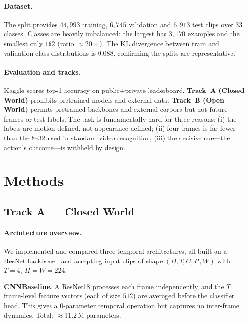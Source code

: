 \documentclass[10pt,twocolumn,letterpaper]{article}
\begin{document}
\paragraph{Dataset.}
The split provides $44{,}993$ training, $6{,}745$ validation and $6{,}913$ test
clips over 33 classes. Classes are heavily imbalanced: the largest has $3{,}170$
examples and the smallest only $162$ (ratio $\approx\!20\times$). The KL divergence
between train and validation class distributions is $0.088$, confirming the
splits are representative.

\paragraph{Evaluation and tracks.}
Kaggle scores top-1 accuracy on public+private leaderboard.
\textbf{Track~A (Closed World)} prohibits pretrained models and external data.
\textbf{Track~B (Open World)} permits pretrained backbones and external corpora
but not future frames or test labels.
The task is fundamentally hard for three reasons:
(i) the labels are motion-defined, not appearance-defined;
(ii) four frames is far fewer than the 8--32 used in standard video recognition;
(iii) the decisive cue---the action's outcome---is withheld by design.

\section{Methods}
\label{sec:method}

\subsection{Track A --- Closed World}
\label{sec:trackA}

\paragraph{Architecture overview.}
We implemented and compared three temporal architectures, all built on a ResNet
backbone~\cite{he2016resnet} and accepting input clips of shape
$(B, T, C, H, W)$ with $T{=}4$, $H{=}W{=}224$.

\noindent\textbf{CNNBaseline.}
A ResNet18 processes each frame independently, and the $T$ frame-level feature
vectors (each of size $512$) are averaged before the classifier head.
This gives a 0-parameter temporal operation but captures no inter-frame dynamics.
Total: $\approx\!11.2$\,M parameters.
\end{document}
